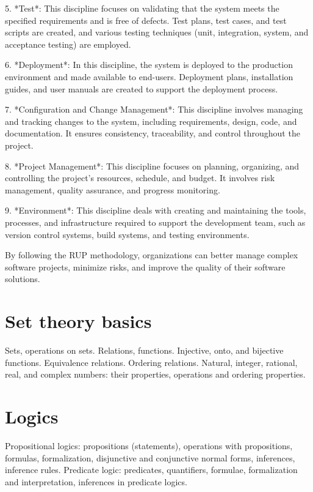 \documentclass{article}
\begin{document}
5. *Test*: This discipline focuses on validating that the system meets the specified requirements and is free of defects. Test plans, test cases, and test scripts are created, and various testing techniques (unit, integration, system, and acceptance testing) are employed.

6. *Deployment*: In this discipline, the system is deployed to the production environment and made available to end-users. Deployment plans, installation guides, and user manuals are created to support the deployment process.

7. *Configuration and Change Management*: This discipline involves managing and tracking changes to the system, including requirements, design, code, and documentation. It ensures consistency, traceability, and control throughout the project.

8. *Project Management*: This discipline focuses on planning, organizing, and controlling the project's resources, schedule, and budget. It involves risk management, quality assurance, and progress monitoring.

9. *Environment*: This discipline deals with creating and maintaining the tools, processes, and infrastructure required to support the development team, such as version control systems, build systems, and testing environments.

By following the RUP methodology, organizations can better manage complex software projects, minimize risks, and improve the quality of their software solutions.


\section{Set theory basics}

Sets, operations on sets. Relations, functions. Injective, onto, and bijective functions. Equivalence relations. Ordering relations. Natural, integer, rational, real, and complex numbers: their properties, operations and ordering properties.


\section{Logics}

Propositional logics: propositions (statements), operations with propositions, formulas, formalization, disjunctive and conjunctive normal forms, inferences, inference rules. Predicate logic: predicates, quantifiers, formulae, formalization and interpretation, inferences in predicate logics.
\end{document}
